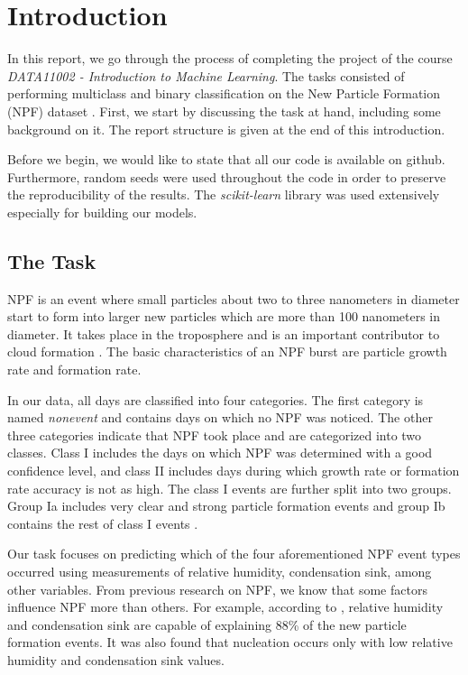 \chapter{Introduction}


In this report, we go through the process of completing the project of the course \textit{DATA11002 - Introduction to Machine Learning}. The tasks consisted of performing multiclass and binary classification on the New Particle Formation (NPF) dataset \cite{npf_paper}. First, we start by discussing the task at hand, including some background on it. The report structure is given at the end of this introduction.

Before we begin, we would like to state that all our code is available on github. Furthermore, random seeds were used throughout the code in order to preserve the reproducibility of the results. The \textit{scikit-learn} \cite{sklearn} library was used extensively especially for building our models.

\section{The Task}

NPF is an event where small particles about two to three nanometers in diameter start to form into larger new particles which are more than 100 nanometers in diameter. It takes place in the troposphere and is an important contributor to cloud formation \cite{npf_paper}. The basic characteristics of an NPF burst are particle growth rate and formation rate.

In our data, all days are classified into four categories. The first category is named \textit{nonevent} and contains days on which no NPF was noticed. The other three categories indicate that NPF took place and are categorized into two classes. Class I includes the days on which NPF was determined with a good confidence level, and class II includes days during which growth rate or formation rate accuracy is not as high. The class I events are further split into two groups. Group Ia includes very clear and strong particle formation events and group Ib contains the rest of class I events \cite{npf_paper}.

Our task focuses on predicting which of the four aforementioned NPF event types occurred using measurements of relative humidity, condensation sink, among other variables. From previous research on NPF, we know that some factors influence NPF more than others. For example, according to \cite{npf_paper_3}, relative humidity and condensation sink are capable of explaining 88\% of the new particle formation events. It was also found that nucleation occurs only with low relative humidity and condensation sink values.

